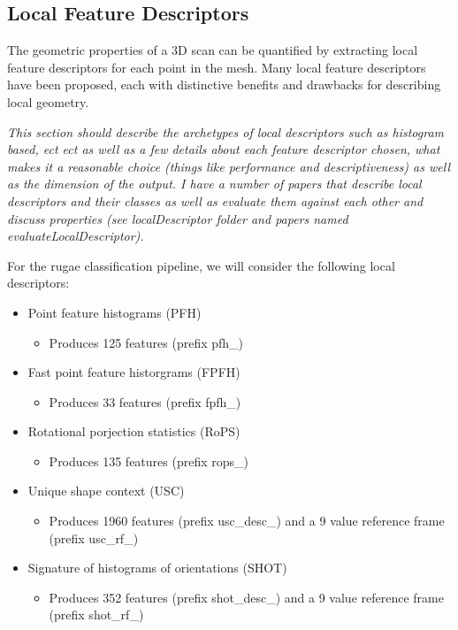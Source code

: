 \documentclass[11pt]{article}
\theoremstyle{definition}
\begin{document}
\subsection{Local Feature Descriptors}

The geometric properties of a 3D scan can be quantified by extracting local feature descriptors for each point in the mesh. Many local feature descriptors have been proposed, each with distinctive benefits and drawbacks for describing local geometry. 

\textit{This section should describe the archetypes of local descriptors such as histogram based, ect ect as well as a few details about each feature descriptor chosen, what makes it a reasonable choice (things like performance and descriptiveness) as well as the dimension of the output. I have a number of papers that describe local descriptors and their classes as well as evaluate them against each other and discuss properties (see localDescriptor folder and papers named evaluateLocalDescriptor).}

For the rugae classification pipeline, we will consider the following local descriptors:
\begin{itemize}
    \item Point feature histograms (PFH)
    \begin{itemize}
        \item Produces 125 features (prefix pfh\_)
    \end{itemize}
    \item Fast point feature historgrams (FPFH)
    \begin{itemize}
        \item Produces 33 features (prefix fpfh\_)
    \end{itemize}
    \item Rotational porjection statistics (RoPS)
    \begin{itemize}
        \item Produces 135 features (prefix rops\_)
    \end{itemize}
    \item Unique shape context (USC)
    \begin{itemize}
        \item Produces 1960 features (prefix usc\_desc\_) and a 9 value reference frame (prefix usc\_rf\_)
    \end{itemize}
    \item Signature of histograms of orientations (SHOT)
    \begin{itemize}
        \item Produces 352 features (prefix shot\_desc\_) and a 9 value reference frame (prefix shot\_rf\_)
    \end{itemize}
\end{itemize}
\end{document}

